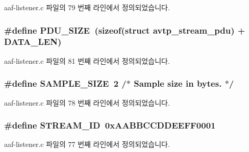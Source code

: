 aaf-\/listener.\+c 파일의 79 번째 라인에서 정의되었습니다.

\subsubsection[{\texorpdfstring{P\+D\+U\+\_\+\+S\+I\+ZE}{PDU_SIZE}}]{\setlength{\rightskip}{0pt plus 5cm}\#define P\+D\+U\+\_\+\+S\+I\+ZE~(sizeof(struct {\bf avtp\+\_\+stream\+\_\+pdu}) + {\bf D\+A\+T\+A\+\_\+\+L\+EN})}\hypertarget{aaf-listener_8c_a4bdc13655ee7bf4cf0e66d16e22dc103}{}\label{aaf-listener_8c_a4bdc13655ee7bf4cf0e66d16e22dc103}


aaf-\/listener.\+c 파일의 81 번째 라인에서 정의되었습니다.

\subsubsection[{\texorpdfstring{S\+A\+M\+P\+L\+E\+\_\+\+S\+I\+ZE}{SAMPLE_SIZE}}]{\setlength{\rightskip}{0pt plus 5cm}\#define S\+A\+M\+P\+L\+E\+\_\+\+S\+I\+ZE~2 /$\ast$ Sample {\bf size} {\bf in} bytes. $\ast$/}\hypertarget{aaf-listener_8c_ae25e0da7cdb20c758a56dc6aece92ba7}{}\label{aaf-listener_8c_ae25e0da7cdb20c758a56dc6aece92ba7}


aaf-\/listener.\+c 파일의 78 번째 라인에서 정의되었습니다.

\subsubsection[{\texorpdfstring{S\+T\+R\+E\+A\+M\+\_\+\+ID}{STREAM_ID}}]{\setlength{\rightskip}{0pt plus 5cm}\#define S\+T\+R\+E\+A\+M\+\_\+\+ID~0x\+A\+A\+B\+B\+C\+C\+D\+D\+E\+E\+F\+F0001}\hypertarget{aaf-listener_8c_ade86a80a3d067dece1f7e7cf957e3e92}{}\label{aaf-listener_8c_ade86a80a3d067dece1f7e7cf957e3e92}


aaf-\/listener.\+c 파일의 77 번째 라인에서 정의되었습니다.



